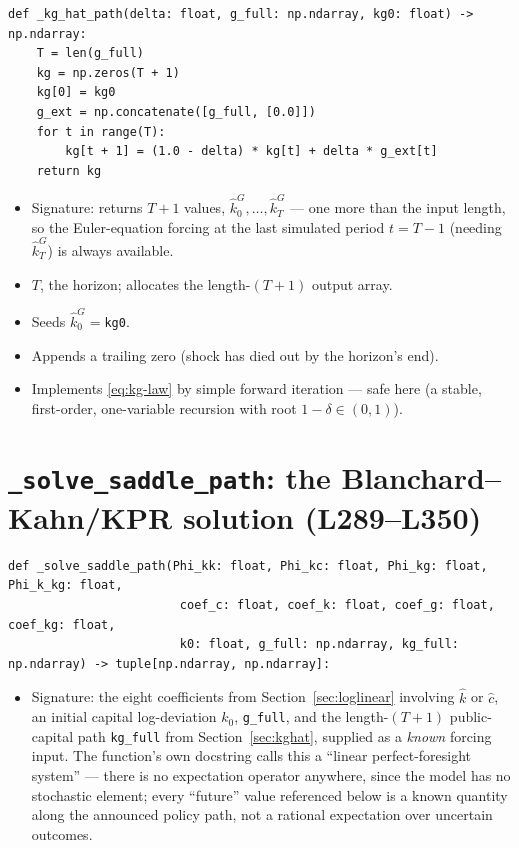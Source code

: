 \documentclass[11pt]{article}
\begin{document}
\begin{lstlisting}[firstnumber=275]
def _kg_hat_path(delta: float, g_full: np.ndarray, kg0: float) -> np.ndarray:
    T = len(g_full)
    kg = np.zeros(T + 1)
    kg[0] = kg0
    g_ext = np.concatenate([g_full, [0.0]])
    for t in range(T):
        kg[t + 1] = (1.0 - delta) * kg[t] + delta * g_ext[t]
    return kg
\end{lstlisting}
\begin{itemize}
\item[\textbf{L275}] Signature: returns $T+1$ values, $\hat k^G_0,\dots,\hat
k^G_T$ --- one more than the input length, so the Euler-equation forcing at
the last simulated period $t=T-1$ (needing $\hat k^G_T$) is always
available.
\item[\textbf{L280--L281}] $T$, the horizon; allocates the length-$(T+1)$
output array.
\item[\textbf{L282}] Seeds $\hat k^G_0=$\texttt{kg0}.
\item[\textbf{L283}] Appends a trailing zero (shock has died out by the
horizon's end).
\item[\textbf{L284--L285}] Implements \eqref{eq:kg-law} by simple forward
iteration --- safe here (a stable, first-order, one-variable recursion with
root $1-\delta\in(0,1)$).
\end{itemize}

\section{\texttt{\_solve\_saddle\_path}: the Blanchard--Kahn/KPR solution (L289--L350)}
\label{sec:saddle}

\begin{lstlisting}[firstnumber=289]
def _solve_saddle_path(Phi_kk: float, Phi_kc: float, Phi_kg: float, Phi_k_kg: float,
                        coef_c: float, coef_k: float, coef_g: float, coef_kg: float,
                        k0: float, g_full: np.ndarray, kg_full: np.ndarray) -> tuple[np.ndarray, np.ndarray]:
\end{lstlisting}
\begin{itemize}
\item[\textbf{L289--L291}] Signature: the eight coefficients from
Section~\ref{sec:loglinear} involving $\hat k$ or $\hat c$, an initial
capital log-deviation $k_0$, \texttt{g\_full}, and the length-$(T+1)$
public-capital path \texttt{kg\_full} from Section~\ref{sec:kghat},
supplied as a \emph{known} forcing input. The function's own docstring
calls this a ``linear perfect-foresight system'' --- there is no
expectation operator anywhere, since the model has no stochastic element;
every ``future'' value referenced below is a known quantity along the
announced policy path, not a rational expectation over uncertain outcomes.
\end{itemize}
\end{document}
